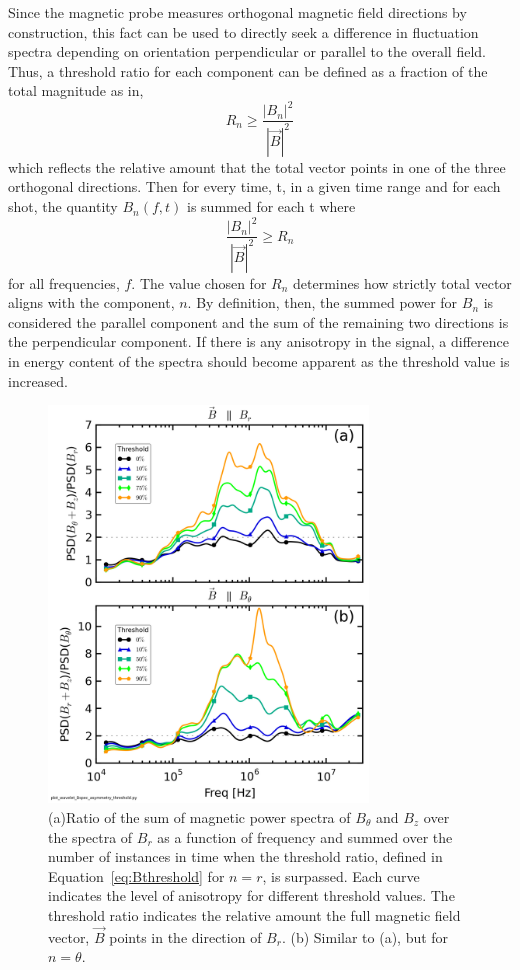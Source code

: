 \documentclass[aip,prl,amsmath,amssymb,reprint,superscriptaddress]{revtex4-1} %
\begin{document}
Since the magnetic probe measures orthogonal magnetic field directions by construction, this fact can be used to directly seek a difference in fluctuation spectra depending on orientation perpendicular or parallel to the overall field. Thus, a threshold ratio for each component can be defined as a fraction of the total magnitude as in,
\begin{equation}
R_{n} \geq \frac{|B_{n}|^{2}}{|\vec{B}|^{2}}
\label{eq:Bthreshold}
\end{equation}
which reflects the relative amount that the total vector points in one of the three orthogonal directions. Then for every time, t, in a given time range and for each shot, the quantity $B_{n}(f,t)$ is summed for each t where
\begin{equation}
\frac{|B_{n}|^{2}}{|\vec{B}|^{2}} \geq R_{n}
\label{eq:Bcondition}
\end{equation}
for all frequencies, $f$. The value chosen for $R_{n}$ determines how strictly total vector aligns with the component, $n$. By definition, then, the summed power for $B_{n}$ is considered the parallel component and the sum of the remaining two directions is the perpendicular component. If there is any anisotropy in the signal, a difference in energy content of the spectra should become apparent as the threshold value is increased.

\begin{figure}[!htbp]
\centerline{
\includegraphics[width=8.5cm]{Bperppara_spectra_thresholdscan40t60us}}
\caption{\label{fig:thresholdmethod} (a)Ratio of the sum of magnetic power spectra of $B_{\theta}$ and $B_{z}$ over the spectra of $B_{r}$ as a function of frequency and summed over the number of instances in time when the threshold ratio, defined in Equation~\ref{eq:Bthreshold} for $n=r$, is surpassed. Each curve indicates the level of anisotropy for different threshold values. The threshold ratio indicates the relative amount the full magnetic field vector, $\vec{B}$ points in the direction of $B_{r}$. (b) Similar to (a), but for $n=\theta$.}
\end{figure}
\end{document}
